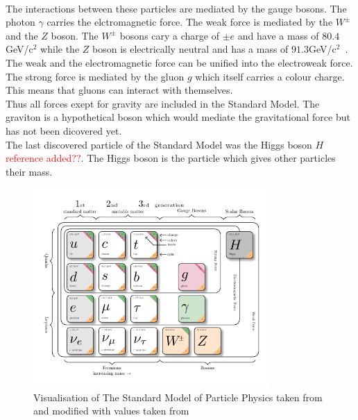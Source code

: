 \\
The interactions between these particles are mediated by the gauge bosons. The photon $\gamma$ carries the elctromagnetic force. The weak force is mediated by the $W^\pm$ and the $Z$ boson. 
The $W^\pm$ bosons cary a charge of $\pm e$ and have a mass of $80.4 $GeV/c$^2$ while the $Z$ boson is electrically neutral and has a mass of $91.3 $GeV/c$^2$~\cite{pdg2025}.
The weak and the electromagnetic force can be unified into the electroweak force. The strong force is mediated by the gluon $g$ which itself carries a colour charge. This means that gluons can interact with themselves.\\
Thus all forces exept for gravity are included in the Standard Model. The graviton is a hypothetical boson which would mediate the gravitational force but has not been dicovered yet.\\
The last discovered particle of the Standard Model was the Higgs boson $H$ \textcolor{red}{reference added??}. The Higgs boson is the particle which gives other particles their mass. 
\begin{figure}
    \centering
    \includegraphics[width=0.8\textwidth]{figures/standard_model_pdf.pdf}
    \caption{Visualisation of The Standard Model of Particle Physics taken from~\cite{texample_model_physics} and modified with values taken from~\cite{pdg2025}}\label{fig:standard_model}
\end{figure}
\\